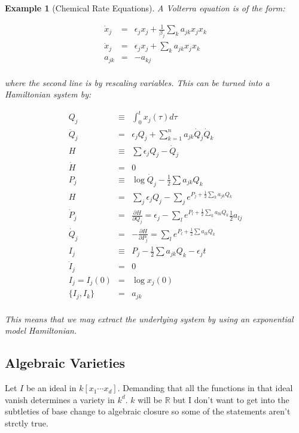 \documentclass[a4paper,landscape]{article}
\theoremstyle{change}
\newtheorem{example}[equation]{Example}
\theoremstyle{nonumberplain}
\numberwithin{equation}{section}
\newcommand\setof[1]{\{ #1 \}}
\begin{document}
\begin{example}[Chemical Rate Equations]

A Volterra equation is of the form:

\begin{eqnarray*}
\dot{x}_j &=& \epsilon_j x_j + \frac{1}{\beta_j} \sum_k a_{jk} x_j x_k\\
\dot{x}_j &=& \epsilon_j x_j + \sum_k a_{jk} x_j x_k\\
a_{jk} &=& - a_{kj}\\
\end{eqnarray*}

where the second line is by rescaling variables. This can be turned into a Hamiltonian system by:

\begin{eqnarray*}
Q_j &\equiv& \int_0^t x_j (\tau ) d\tau\\
\ddot{Q}_j &=& \epsilon_j Q_j + \sum_{k=1}^n a_{jk} \dot{Q}_j \dot{Q}_k\\
H &\equiv& \sum \epsilon_j Q_j - \dot{Q}_j\\
\dot{H} &=& 0\\
P_j &\equiv& \log \dot{Q}_j - \frac{1}{2} \sum a_{jk} Q_k\\
H &=& \sum_j \epsilon_j Q_j - \sum_j e^{P_j + \frac{1}{2} \sum_k a_{jk} Q_k}\\
\dot{P}_j &=& \frac{\partial H}{\partial Q_j} = \epsilon_j - \sum_l e^{P_l + \frac{1}{2} \sum_k a_{lk} Q_k} \frac{1}{2} a_{lj}\\
\dot{Q}_j &=& - \frac{\partial H}{\partial P_j} = \sum_l e^{P_l + \frac{1}{2} \sum a_{lk} Q_k }\\
I_j &\equiv& P_j - \frac{1}{2} \sum a_{jk} Q_k - \epsilon_j t\\
\dot{I}_j &=& 0\\
I_j = I_j (0) &=& \log x_j (0)\\
\setof{I_j , I_k } &=& a_{jk}\\
\end{eqnarray*}

This means that we may extract the underlying system by using an exponential model Hamiltonian.

\end{example}

\subsection{Algebraic Varieties}

Let $I$ be an ideal in $k[x_1 \cdots x_d]$. Demanding that all the functions in that ideal vanish determines a variety in $k^d$. $k$ will be $\mathbb{R}$ but I don't want to get into the subtleties of base change to algebraic closure so some of the statements aren't strctly true.
\end{document}
